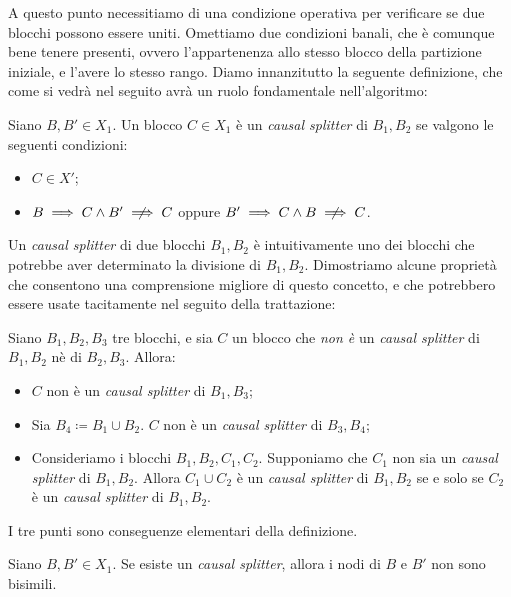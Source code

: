 A questo punto necessitiamo di una condizione operativa per verificare se due blocchi possono essere uniti. Omettiamo due condizioni banali, che è comunque bene tenere presenti, ovvero l'appartenenza allo stesso blocco della partizione iniziale, e l'avere lo stesso rango. Diamo innanzitutto la seguente definizione, che come si vedrà nel seguito avrà un ruolo fondamentale nell'algoritmo:

\begin{definition}
    \label{def:causal_splitter}
    Siano $B,B' \in X_1$. Un blocco $C \in X_1$ è un \emph{causal splitter} di $B_1,B_2$ se valgono le seguenti condizioni:
    \begin{itemize}
        \item $C \in X'$;
        \item $B \implies C \land B' \centernot\implies C$ oppure $B' \implies C \land B \centernot\implies C$.
    \end{itemize}
\end{definition}

Un \emph{causal splitter} di due blocchi $B_1,B_2$ è intuitivamente uno dei blocchi che potrebbe aver determinato la divisione di $B_1,B_2$. Dimostriamo alcune proprietà che consentono una comprensione migliore di questo concetto, e che potrebbero essere usate tacitamente nel seguito della trattazione:

\begin{observation}
    Siano $B_1, B_2, B_3$ tre blocchi, e sia $C$ un blocco che \emph{non è} un \emph{causal splitter} di $B_1,B_2$ nè di $B_2,B_3$. Allora:
    \begin{itemize}
        \item $C$ non è un \emph{causal splitter} di $B_1,B_3$;
        \item Sia $B_4 \coloneqq B_1 \cup B_2$. $C$ non è un \emph{causal splitter} di $B_3, B_4$;
        \item Consideriamo i blocchi $B_1, B_2, C_1, C_2$. Supponiamo che $C_1$ non sia un \emph{causal splitter} di $B_1,B_2$. Allora $C_1 \cup C_2$ è un \emph{causal splitter} di $B_1,B_2$ se e solo se $C_2$ è un \emph{causal splitter} di $B_1,B_2$.
    \end{itemize}
\end{observation}
\begin{proof2}
    I tre punti sono conseguenze elementari della definizione.
\end{proof2}

\begin{corollary}
    \label{cor:criterio_causal_splitter}
    Siano $B,B' \in X_1$. Se esiste un \emph{causal splitter}, allora i nodi di $B$ e $B'$ non sono bisimili.
\end{corollary}

